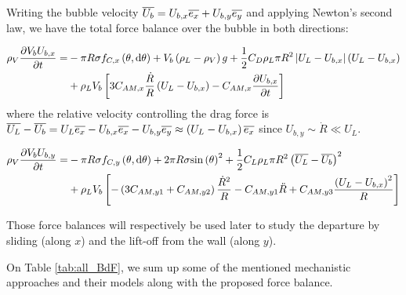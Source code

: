 Writing the bubble velocity $\overline{U_{b}} = U_{b,x}\overline{e_{x}} + U_{b,y}\overline{e_{y}}$ and applying Newton's second law, we have the total force balance over the bubble in both directions:

\begin{align}
\nonumber \rho_{V} \dtime{V_{b}U_{b,x}} = & -\pi R \sigma f_{C,x}\parth{\theta, \dtheta} + V_{b}\parth{\rho_{L}-\rho_{V}}g + \frac{1}{2}C_{D}\rho_{L}\pi R^{2} \bars{U_{L}-U_{b,x}}\parth{U_{L}-U_{b,x}}\\
%
& + \rho_{L}V_{b}\crocht{3C_{AM,x}\frac{\dot{R}}{R}\parth{U_{L}-U_{b,x}} - C_{AM,x} \dtime{U_{b,x}}}
\label{eq:bdf_x}
\end{align}
where the relative velocity controlling the drag force is $\overline{U_{L}} - \overline{U_{b}} = U_{L}\overline{e_{x}} -  U_{b,x}\overline{e_{x}} - U_{b,y}\overline{e_{y}} \approx \left( U_{L}-U_{b,x} \right) \overline{e_{x}}$ since $U_{b,y}\sim \dot{R} \ll U_{L}$.

\begin{align}
\nonumber \rho_{V} \dtime{V_{b}U_{b,y}} = & -\pi R \sigma f_{C,y}\parth{\theta, \dtheta} + 2\pi R \sigma \sin{\theta}^{2} + \frac{1}{2}C_{L}\rho_{L}\pi R^{2} \parth{\vect{U_{L}}-\vect{U_{b}}}^{2}\\
%
& + \rho_{L}V_{b}\crocht{-\parth{3 C_{AM,y1} + C_{AM,y2}}\frac{\dot{R}^{2}}{R}-C_{AM,y1}\ddot{R} + C_{AM,y3}\frac{\parth{U_{L}-U_{b,x}}^{2}}{R}}
\label{eq:bdf_y}
\end{align}

Those force balances will respectively be used later to study the departure by sliding (along $x$) and the lift-off from the wall (along $y$).

\npar

On Table \ref{tab:all_BdF}, we sum up some of the mentioned mechanistic approaches and their models along with the proposed force balance.



